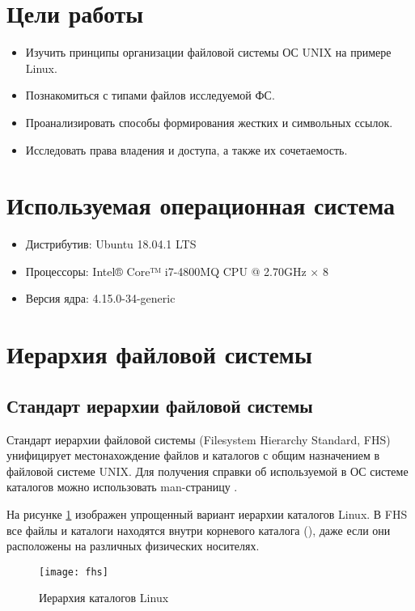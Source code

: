 





\tableofcontents
\newpage

\section{Цели работы}

\begin{itemize}
	\item Изучить принципы организации файловой системы ОС UNIX на примере Linux.
	\item Познакомиться с типами файлов исследуемой ФС.
	\item Проанализировать способы формирования жестких и символьных ссылок.
	\item Исследовать права владения и доступа, а также их сочетаемость.
\end{itemize}

\section{Используемая операционная система}

\begin{itemize}
	\item Дистрибутив: Ubuntu 18.04.1 LTS
	\item Процессоры: Intel® Core™ i7-4800MQ CPU @ 2.70GHz × 8
	\item Версия ядра: 4.15.0-34-generic
\end{itemize}

\section{Иерархия файловой системы}

\subsection{Стандарт иерархии файловой системы}

Стандарт иерархии файловой системы (Filesystem Hierarchy Standard, FHS) унифицирует местонахождение файлов и каталогов с общим назначением в файловой системе UNIX. Для получения справки об используемой в ОС системе каталогов можно использовать man-страницу .

На рисунке \ref{fig:fhs} изображен упрощенный вариант иерархии каталогов Linux. В FHS все файлы и каталоги находятся внутри корневого каталога (\code{/}), даже если они расположены на различных физических носителях. 
\begin{figure}[H]
	\centering
	\texttt{[image: fhs]}
	\caption{Иерархия каталогов Linux}
	\label{fig:fhs}
\end{figure}

